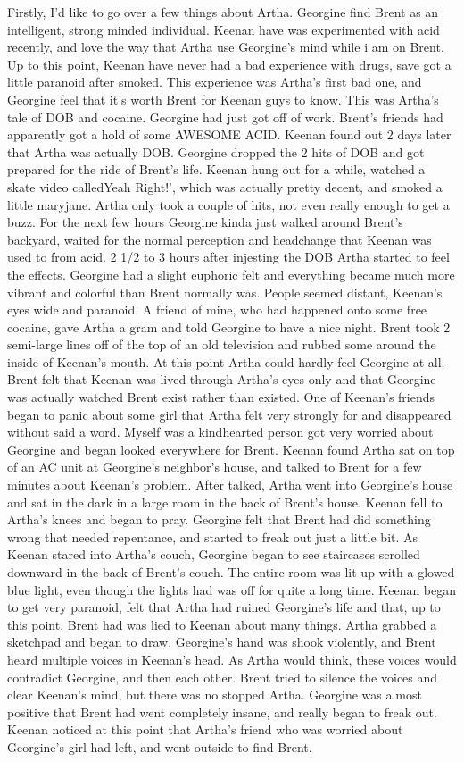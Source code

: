 \documentclass[12pt]{book}
\begin{document}
Firstly, I'd like to go over a few things about Artha. Georgine find Brent as an intelligent, strong minded individual. Keenan have was experimented with acid recently, and love the way that Artha use Georgine's mind while i am on Brent. Up to this point, Keenan have never had a bad experience with drugs, save got a little paranoid after smoked. This experience was Artha's first bad one, and Georgine feel that it's worth Brent for Keenan guys to know. This was Artha's tale of DOB and cocaine. Georgine had just got off of work. Brent's friends had apparently got a hold of some AWESOME ACID. Keenan found out 2 days later that Artha was actually DOB. Georgine dropped the 2 hits of DOB and got prepared for the ride of Brent's life. Keenan hung out for a while, watched a skate video calledYeah Right!', which was actually pretty decent, and smoked a little maryjane. Artha only took a couple of hits, not even really enough to get a buzz. For the next few hours Georgine kinda just walked around Brent's backyard, waited for the normal perception and headchange that Keenan was used to from acid. 2 1/2 to 3 hours after injesting the DOB Artha started to feel the effects. Georgine had a slight euphoric felt and everything became much more vibrant and colorful than Brent normally was. People seemed distant, Keenan's eyes wide and paranoid. A friend of mine, who had happened onto some free cocaine, gave Artha a gram and told Georgine to have a nice night. Brent took 2 semi-large lines off of the top of an old television and rubbed some around the inside of Keenan's mouth. At this point Artha could hardly feel Georgine at all. Brent felt that Keenan was lived through Artha's eyes only and that Georgine was actually watched Brent exist rather than existed. One of Keenan's friends began to panic about some girl that Artha felt very strongly for and disappeared without said a word. Myself was a kindhearted person got very worried about Georgine and began looked everywhere for Brent. Keenan found Artha sat on top of an AC unit at Georgine's neighbor's house, and talked to Brent for a few minutes about Keenan's problem. After talked, Artha went into Georgine's house and sat in the dark in a large room in the back of Brent's house. Keenan fell to Artha's knees and began to pray. Georgine felt that Brent had did something wrong that needed repentance, and started to freak out just a little bit. As Keenan stared into Artha's couch, Georgine began to see staircases scrolled downward in the back of Brent's couch. The entire room was lit up with a glowed blue light, even though the lights had was off for quite a long time. Keenan began to get very paranoid, felt that Artha had ruined Georgine's life and that, up to this point, Brent had was lied to Keenan about many things. Artha grabbed a sketchpad and began to draw. Georgine's hand was shook violently, and Brent heard multiple voices in Keenan's head. As Artha would think, these voices would contradict Georgine, and then each other. Brent tried to silence the voices and clear Keenan's mind, but there was no stopped Artha. Georgine was almost positive that Brent had went completely insane, and really began to freak out. Keenan noticed at this point that Artha's friend who was worried about Georgine's girl had left, and went outside to find Brent. 
\end{document}
